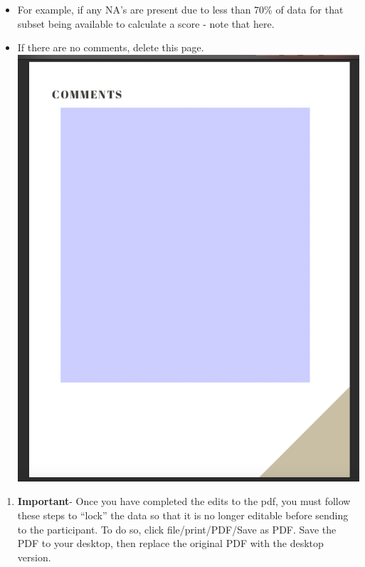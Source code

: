 \documentclass[]{book}
\providecommand{\tightlist}{%
  \setlength{\itemsep}{0pt}\setlength{\parskip}{0pt}}
\begin{document}
\begin{itemize}
\tightlist
\item
  For example, if any NA's are present due to less than 70\% of data for that subset being available to calculate a score - note that here.
\item
  If there are no comments, delete this page.
  \includegraphics{images/report_card_online/5.png}
\end{itemize}

\begin{enumerate}
\def\labelenumi{\arabic{enumi}.}
\setcounter{enumi}{5}
\tightlist
\item
  \textbf{Important}- Once you have completed the edits to the pdf, you must follow these steps to ``lock'' the data so that it is no longer editable before sending to the participant. To do so, click file/print/PDF/Save as PDF. Save the PDF to your desktop, then replace the original PDF with the desktop version.
\end{enumerate}
\end{document}
